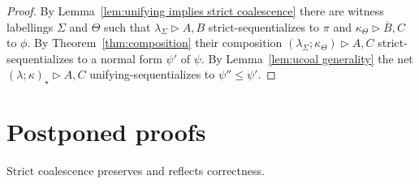 \documentclass[UKenglish]{lipics-v2016}
\makeatletter
\theoremstyle{plain}
\newcommand\+{+}
\renewcommand\*{\times}
\newcommand\dual[1]{\overline{#1}}
\newcommand\seq[2]{{\vdash}#1,#2}
\newcommand\Seq{\vphantom(\seq}
\newcommand\Prf[3]{\deduce{\Seq{#2}{#3}}{\vphantom(#1}}
\newcommand\net[3]{#1\triangleright #2,#3}
\newcommand\comp{\mathbin;}
\newcommand\Qrr{\!\!\scriptstyle\qrr}
\newcommand\qrr[1]{
  \ifx#1+\expandafter\@qrr\else
  \ifx#1*\*\mathrm R\else
  \ifx#1!\forall\mathrm R\else
  \ifx#1?\expandafter\@@qrr\else
  \ifx#11\mathrm{ax}\else
  \ifx#1.\mathrm{cut}\else
  #1\mathrm R
  \fi\fi\fi\fi\fi\fi
}
\newcommand\@qrr[1]{+\mathrm R,#1}
\newcommand\@@qrr[1]{\exists\mathrm R,#1}
\makeatother
\begin{document}

\begin{proof}
By Lemma~\ref{lem:unifying implies strict coalescence} there are witness labellings $\Sigma$ and $\Theta$ such that $\net{\lambda_\Sigma}AB$ strict-sequentializes to $\pi$ and $\net{\kappa_\Theta}{\dual B}C$ to $\phi$. By Theorem~\ref{thm:composition} their composition $(\net{\lambda_\Sigma\comp\kappa_\Theta)}AC$ strict-sequentializes to a normal form $\psi'$ of $\psi$. By Lemma~\ref{lem:ucoal generality} the net $\net{(\lambda\comp\kappa)_\star}AC$ unifying-sequentializes to $\psi''\leq\psi'$.
\end{proof}






\newpage
\appendix

\section{Postponed proofs}


\setcounter{theorem}{\thelemcorrect}
\begin{lemma}[Restatement]
Strict coalescence preserves and reflects correctness.
\end{lemma}
\end{document}
